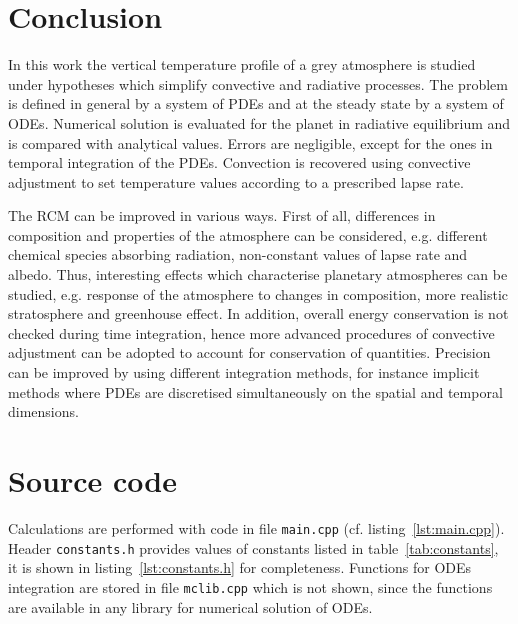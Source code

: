 \documentclass[a4paper,10pt,twocolumn,\classoptions]{article}
\begin{document}
\section{Conclusion}
In this work the vertical temperature profile of a grey atmosphere is studied under hypotheses which simplify convective and radiative processes. The problem is defined in general by a system of PDEs and at the steady state by a system of ODEs. Numerical solution is evaluated for the planet in radiative equilibrium and is compared with analytical values. Errors are negligible, except for the ones in temporal integration of the PDEs. Convection is recovered using convective adjustment to set temperature values according to a prescribed lapse rate.

The RCM can be improved in various ways. First of all, differences in composition and properties of the atmosphere can be considered, e.g. different chemical species absorbing radiation, non-constant values of lapse rate and albedo. Thus, interesting effects which characterise planetary atmospheres can be studied, e.g. response of the atmosphere to changes in composition, more realistic stratosphere and greenhouse effect. In addition, overall energy conservation is not checked during time integration, hence more advanced procedures of convective adjustment can be adopted to account for conservation of quantities. Precision can be improved by using different integration methods, for instance implicit methods where PDEs are discretised simultaneously on the spatial and temporal dimensions.



\newpage
\appendix

\section{Source code}
Calculations are performed with code in file \texttt{main.cpp} (cf. listing~\ref{lst:main.cpp}). Header \texttt{constants.h} provides values of constants listed in table~\ref{tab:constants}, it is shown in listing~\ref{lst:constants.h} for completeness. Functions for ODEs integration are stored in file \texttt{mclib.cpp} which is not shown, since the functions are available in any library for numerical solution of ODEs.
\onecolumn


\twocolumn
\end{document}
